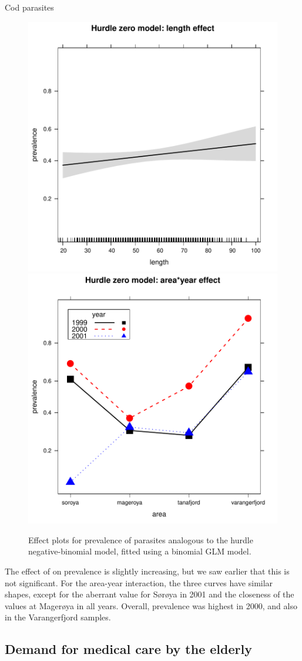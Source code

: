 \documentclass[11pt]{book}\usepackage[]{graphicx}\usepackage[]{color}
\newenvironment{knitrout}{}{} %
\renewenvironment{knitrout}{\small\renewcommand{\baselinestretch}{.85}}{} %
\begin{document}
\begin{Example}[cod3]{Cod parasites}
\begin{knitrout}
\begin{figure}[!htbp]
\centerline{\includegraphics[width=.49\textwidth]{ch09/fig/cod3-eff21} 
\includegraphics[width=.49\textwidth]{ch09/fig/cod3-eff22} }

\caption[Effect plots for prevalence of parasites analogous to  the hurdle negative-binomial model, fitted using a binomial GLM model]{Effect plots for prevalence of parasites analogous to  the hurdle negative-binomial model, fitted using a binomial GLM model.\label{fig:cod3-eff2}}
\end{figure}


\end{knitrout}
The effect of  on prevalence is slightly increasing, but we saw earlier that this is
not significant.  For the area-year interaction, the three curves have similar shapes, except
for the aberrant value for S{\o}r{\o}ya in 2001 and the closeness of the values at
Mager{\o}ya in all years. Overall, prevalence was highest in 2000, and also in 
the Varangerfjord samples.

\end{Example}


\subsection{Demand for medical care by the elderly}\label{sec:glm-case-nmes}
\end{document}
